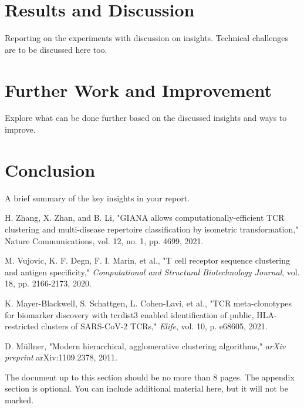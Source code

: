 \documentclass[conference]{IEEEtran}
\begin{document}
	
	\section{Results and Discussion}
	{\color{blue}Reporting on the experiments with discussion on insights. Technical challenges are to be discussed here too.}
	
	\section{Further Work and Improvement}
	{\color{blue}Explore what can be done further based on the discussed insights and ways to improve.}
	
	\section{Conclusion}
	{\color{blue}A brief summary of the key insights in your report.}
	
	\begin{thebibliography}{00}
		
		 H. Zhang, X. Zhan, and B. Li, "GIANA allows computationally-efficient TCR clustering and multi-disease repertoire classification by isometric transformation," Nature Communications, vol. 12, no. 1, pp. 4699, 2021.
		
		 M. Vujovic, K. F. Degn, F. I. Marin, et al., "T cell receptor sequence clustering and antigen specificity," \textit{Computational and Structural Biotechnology Journal}, vol. 18, pp. 2166-2173, 2020.
		
		 K. Mayer-Blackwell, S. Schattgen, L. Cohen-Lavi, et al., "TCR meta-clonotypes for biomarker discovery with tcrdist3 enabled identification of public, HLA-restricted clusters of SARS-CoV-2 TCRs," \textit{Elife}, vol. 10, p. e68605, 2021.
		
		 D. Müllner, "Modern hierarchical, agglomerative clustering algorithms,"
		\textit{arXiv preprint} arXiv:1109.2378, 2011.
		
	\end{thebibliography}
	
	\appendix
	{\color{blue}The document up to this section should be no more than 8 pages. The appendix section is optional. You can include additional material here, but it will not be marked.}
	
\end{document}
